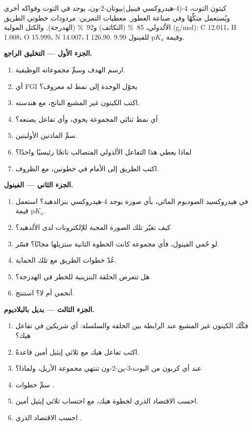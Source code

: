 \begin{problem}
\label{pb:b2:retrosynthesis:1}
كيتون التوت، 4-(4-هيدروكسي فينيل)بيوتان-2-ون، يوجد في التوت وفواكه أخرى ويُستعمل
منكِّهًا وفي صناعة العطور. معطيات التمرين: مردودات خطوتي الطريق الألدولي، 85~\% (التكاثف)
و92~\% (الهدرجة). والكتل المولية (\unit{g/mol}): C 12.011، H 1.008، O 15.999، N 14.007،
I 126.90. وقيمة $\mathrm pK_a$ للفينول 9.99.

\medskip
\noindent\textbf{الجزء الأول --- التخليق الراجع.}
\begin{enumerate}
  \item ارسم الهدف وسمِّ مجموعاته الوظيفية.
  \item أي FGI يحوّل الوحدة  إلى نمط له  معروف؟
  \item اكتب الكيتون غير المشبع الناتج، مع هندسته.
  \item أي نمط ثنائي المجموعة يحوي، وأي تفاعل يصنعه؟
  \item سمِّ المادتين الأوليتين.
  \item لماذا يعطي هذا التفاعل الألدولي المتصالب ناتجًا رئيسيًا واحدًا؟
  \item اكتب الطريق إلى الأمام في خطوتين، مع الظروف.
\end{enumerate}

\medskip
\noindent\textbf{الجزء الثاني --- الفينول.}
\begin{enumerate}[resume]
  \item في هيدروكسيد الصوديوم المائي، بأي صورة يوجد 4-هيدروكسي بنزالدهيد؟ استعمل
        قيمة $\mathrm pK_a$.
  \item كيف تغيّر تلك الصورة المحبة للإلكترونات لدى الألدهيد؟
  \item لو حُمي الفينول، فأي مجموعة كانت الخطوة الثانية ستزيلها مجانًا؟ فسّر.
  \item عُدّ خطوات الطريق مع تلك الحماية.
  \item هل تتعرض الحلقة البنزينية للخطر في الهدرجة؟
  \item أنحمي أم لا؟ استنتج.
\end{enumerate}

\medskip
\noindent\textbf{الجزء الثالث --- بديل بالبلاديوم.}
\begin{enumerate}[resume]
  \item فكّك الكيتون غير المشبع عند الرابطة بين الحلقة والسلسلة: أي شريكين في تفاعل
        هيك؟
  \item اكتب تفاعل هيك مع ثلاثي إيثيل أمين قاعدةً.
  \item عند أي كربون من البوت-3-ين-2-ون تنتهي مجموعة الأريل، ولماذا؟
  \item سمِّ خطوات .
  \item احسب الاقتصاد الذري لخطوة هيك، مع احتساب ثلاثي إيثيل أمين.
  \item احسب الاقتصاد الذري .
\end{enumerate}


\end{problem}
